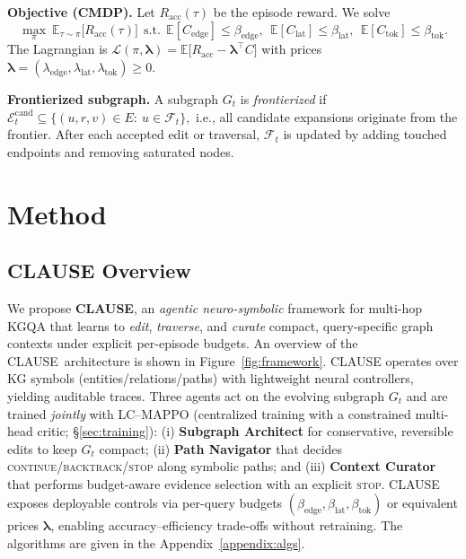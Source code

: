 \documentclass{article} %
\newcommand{\method}{\textsc{CLAUSE}\xspace}
\begin{document}
\textbf{Objective (CMDP).}
Let \(R_{\mathrm{acc}}(\tau)\) be the episode reward. We solve
\begin{equation}
\label{eq:cmdp}
\max_{\pi}\ \mathbb{E}_{\tau\sim\pi}\!\big[R_{\mathrm{acc}}(\tau)\big]
\ \ \text{s.t.}\ \
\mathbb{E}[C_{\mathrm{edge}}]\le\beta_{\mathrm{edge}},\ \
\mathbb{E}[C_{\mathrm{lat}}]\le\beta_{\mathrm{lat}},\ \
\mathbb{E}[C_{\mathrm{tok}}]\le\beta_{\mathrm{tok}}.
\end{equation}
The Lagrangian is
\(
\mathcal{L}(\pi,\boldsymbol{\lambda})=\mathbb{E}\!\big[R_{\mathrm{acc}}-\boldsymbol{\lambda}^{\top}C\big]
\)
with prices \(\boldsymbol{\lambda}=(\lambda_{\text{edge}},\lambda_{\text{lat}},\lambda_{\text{tok}})\ge 0\).

\textbf{Frontierized subgraph.}
A subgraph \(G_t\) is \emph{frontierized} if
$
\mathcal{E}^{\mathrm{cand}}_t\subseteq \{(u,r,v)\in E:\ u\in\mathcal{F}_t\},
$
i.e., all candidate expansions originate from the frontier. After each accepted edit or traversal,
\(\mathcal{F}_t\) is updated by adding touched endpoints and removing saturated nodes.

\section{Method}
\label{sec:method}

\subsection{CLAUSE Overview}
We propose \textbf{\method}, an \emph{agentic neuro-symbolic} framework for multi-hop KGQA that learns to \emph{edit}, \emph{traverse}, and \emph{curate} compact, query-specific graph contexts under explicit per-episode budgets. An overview of the \method\ architecture is shown in Figure~\ref{fig:framework}. \method operates over KG symbols (entities/relations/paths) with lightweight neural controllers, yielding auditable traces. Three agents act on the evolving subgraph $G_t$ and are trained \emph{jointly} with LC–MAPPO (centralized training with a constrained multi-head critic; \S\ref{sec:training}): (i) \textbf{Subgraph Architect} for conservative, reversible edits to keep $G_t$ compact; (ii) \textbf{Path Navigator} that decides \textsc{continue}/\textsc{backtrack}/\textsc{stop} along symbolic paths; and (iii) \textbf{Context Curator} that performs budget-aware evidence selection with an explicit \textsc{stop}. \method exposes deployable controls via per-query budgets $(\beta_{\mathrm{edge}},\beta_{\mathrm{lat}},\beta_{\mathrm{tok}})$ or equivalent prices $\boldsymbol{\lambda}$, enabling accuracy–efficiency trade-offs without retraining. The algorithms are given in the Appendix~\ref{appendix:algs}.
\end{document}
